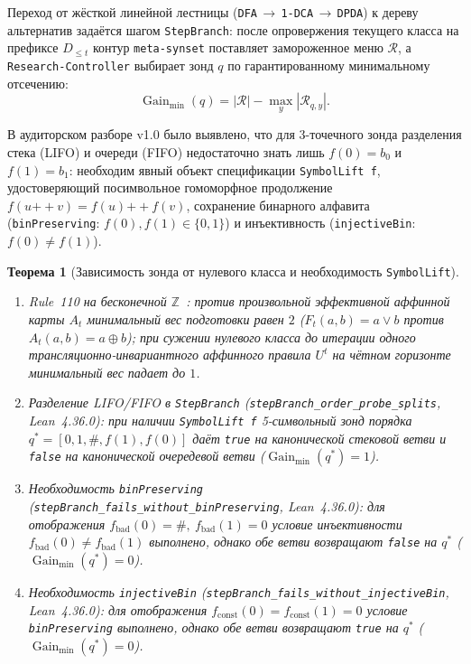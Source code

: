 \documentclass[11pt,a4paper]{article}
\theoremstyle{preprintthm}
\newtheorem{theorem}{Теорема}[section]
\theoremstyle{preprintdef}
\newcommand{\calR}{\mathcal{R}}
\newcommand{\Gain}{\operatorname{Gain}}
\begin{document}
Переход от жёсткой линейной лестницы (\texttt{DFA}\,$\to$\,\texttt{1-DCA}\,$\to$\,\texttt{DPDA}) к дереву альтернатив задаётся шагом \texttt{StepBranch}: после опровержения текущего класса на префиксе $D_{\le t}$ контур \texttt{meta-synset} поставляет замороженное меню $\calR$, а \texttt{Research-Controller} выбирает зонд $q$ по гарантированному минимальному отсечению:
\begin{equation}
  \Gain_{\min}(q) = |\calR| - \max_{y} |\calR_{q,y}|.
\end{equation}

В аудиторском разборе v1.0 было выявлено, что для 3-точечного зонда разделения стека (LIFO) и очереди (FIFO) недостаточно знать лишь $f(0)=b_0$ и $f(1)=b_1$: необходим явный объект спецификации \texttt{SymbolLift f}, удостоверяющий посимвольное гомоморфное продолжение $f(u\mathbin{+\!\!+} v)=f(u)\mathbin{+\!\!+} f(v)$, сохранение бинарного алфавита (\texttt{binPreserving}: $f(0),f(1)\in\{0,1\}$) и инъективность (\texttt{injectiveBin}: $f(0)\ne f(1)$).

\begin{theorem}[Зависимость зонда от нулевого класса и необходимость \texttt{SymbolLift}]
\label{thm:probe_complexity}
\begin{enumerate}
  \item \emph{Rule~110 на бесконечной $\mathbb{Z}$~\cite[Теоремы~4--5]{strand2026ms2}:} против произвольной эффективной аффинной карты $A_t$ минимальный вес подготовки равен $2$ ($F_t(a,b)=a\lor b$ против $A_t(a,b)=a\oplus b$); при сужении нулевого класса до итерации одного трансляционно-инвариантного аффинного правила $U^t$ на чётном горизонте минимальный вес падает до $1$.
  \item \emph{Разделение LIFO/FIFO в \texttt{StepBranch} (\texttt{stepBranch\_\allowbreak order\_\allowbreak probe\_\allowbreak splits}, Lean~4.36.0):} при наличии \texttt{SymbolLift f} 5-символьный зонд порядка $q^*=[0,1,\#,f(1),f(0)]$ даёт \texttt{true} на канонической стековой ветви и \texttt{false} на канонической очередевой ветви ($\Gain_{\min}(q^*)=1$).
  \item \emph{Необходимость \texttt{binPreserving} (\texttt{stepBranch\_\allowbreak fails\_\allowbreak without\_\allowbreak binPreserving}, Lean~4.36.0):} для отображения $f_{\mathrm{bad}}(0)=\#,\ f_{\mathrm{bad}}(1)=0$ условие инъективности $f_{\mathrm{bad}}(0)\ne f_{\mathrm{bad}}(1)$ выполнено, однако обе ветви возвращают \texttt{false} на $q^*$ ($\Gain_{\min}(q^*)=0$).
  \item \emph{Необходимость \texttt{injectiveBin} (\texttt{stepBranch\_\allowbreak fails\_\allowbreak without\_\allowbreak injectiveBin}, Lean~4.36.0):} для отображения $f_{\mathrm{const}}(0)=f_{\mathrm{const}}(1)=0$ условие \texttt{binPreserving} выполнено, однако обе ветви возвращают \texttt{true} на $q^*$ ($\Gain_{\min}(q^*)=0$).
\end{enumerate}
\end{theorem}
\end{document}
